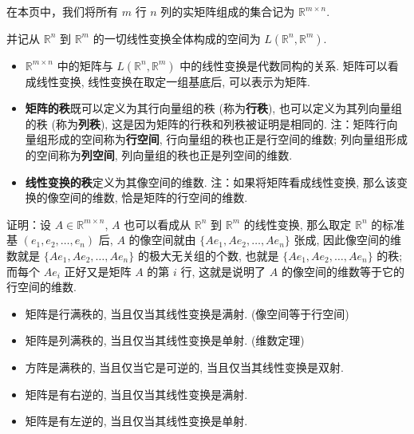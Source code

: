 
在本页中，我们将所有 $m$ 行 $n$ 列的实矩阵组成的集合记为 $\mathbb{R}^{m\times n}.$

并记从 $\mathbb{R}^{n}$ 到 $\mathbb{R}^{m}$ 的一切线性变换全体构成的空间为 $L(\mathbb{R}^{n},\mathbb{R}^{m}).$
\begin{itemize}
\item $\mathbb{R}^{m\times n}$ 中的矩阵与 $L(\mathbb{R}^{n},\mathbb{R}^{m})$
中的线性变换是代数同构的关系. 矩阵可以看成线性变换, 线性变换在取定一组基底后, 可以表示为矩阵. 
\end{itemize}

\begin{itemize}
\item \textbf{矩阵的秩}既可以定义为其行向量组的秩 (称为\textbf{行秩}), 也可以定义为其列向量组的秩 (称为\textbf{列秩}),
这是因为矩阵的行秩和列秩被证明是相同的. 注：矩阵行向量组形成的空间称为\textbf{行空间}, 行向量组的秩也正是行空间的维数;
列向量组形成的空间称为\textbf{列空间}, 列向量组的秩也正是列空间的维数.
\end{itemize}

\begin{itemize}
\item \textbf{线性变换的秩}定义为其像空间的维数. 注：如果将矩阵看成线性变换, 那么该变换的像空间的维数, 恰是矩阵的行空间的维数. 
\end{itemize}

证明：设 $A\in\mathbb{R}^{m\times n}$, $A$ 也可以看成从 $\mathbb{R}^{n}$ 到 $\mathbb{R}^{m}$
的线性变换, 那么取定 $\mathbb{R}^{n}$ 的标准基 $(e_{1},e_{2},\ldots,e_{n})$ 后,
$A$ 的像空间就由 $\{Ae_{1},Ae_{2},\ldots,Ae_{n}\}$ 张成, 因此像空间的维数就是 $\{Ae_{1},Ae_{2},\ldots,Ae_{n}\}$
的极大无关组的个数, 也就是 $\{Ae_{1},Ae_{2},\ldots,Ae_{n}\}$ 的秩; 而每个 $Ae_{i}$
正好又是矩阵 $A$ 的第 $i$ 行, 这就是说明了 $A$ 的像空间的维数等于它的行空间的维数. 

\begin{itemize}
\item 矩阵是行满秩的, 当且仅当其线性变换是满射. (像空间等于行空间)
\end{itemize}

\begin{itemize}
\item 矩阵是列满秩的, 当且仅当其线性变换是单射. (维数定理)
\end{itemize}

\begin{itemize}
\item 方阵是满秩的, 当且仅当它是可逆的, 当且仅当其线性变换是双射. \end{itemize}

\begin{itemize}
\item 矩阵是有右逆的, 当且仅当其线性变换是满射. \end{itemize}

\begin{itemize}
\item 矩阵是有左逆的, 当且仅当其线性变换是单射. 
\end{itemize}